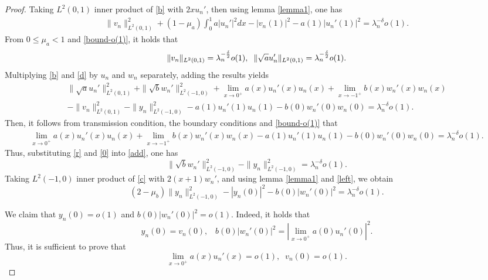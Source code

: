 \documentclass[twoside]{article}
\theoremstyle{noparens}
\theoremstyle{definition}
\numberwithin{equation}{section}
\numberwithin{figure}{section}
\begin{document}
\begin{proof}
Taking $L^2(0,1)$ inner product of \eqref{b} with $2xu_n'$, then using lemma \ref{lemma1}, one has
\begin{equation*}
	\begin{gathered}
		\|v_n\|_{L^2(0,1)}^2 + (1-\mu_a)\int_{0}^1 a|u_n'|^2 dx - |v_n(1)|^2
		-a(1)|u_n'(1)|^2
		=\lambda_n^{-\delta}o(1).
	\end{gathered}
\end{equation*}
From $0\leq \mu_a<1$ and \eqref{bound-o(1)}, it holds that
\begin{equation}\label{r}
	\|v_n\|_{L^2(0,1)} = \lambda_n^{-{\delta\over 2}}o(1),\;\;
	\|\sqrt{a}u_n'\|_{L^2(0,1)} = \lambda_n^{-{\delta\over2}}o(1).
\end{equation}
Multiplying \eqref{b} and \eqref{d} by $u_n$ and $w_n$ separately, adding the results yields
\begin{equation}\label{add}
	\begin{gathered}
		\|\sqrt{a}u_n'\|_{L^2(0,1)}^2+\|\sqrt{b}w_n'\|_{L^2(-1,0)}^2
		+ \lim_{x\to0^+} a(x)u_n'(x)u_n(x)+ \lim_{x\to-1^+}b(x)w_n'(x)w_n(x)\\
		- \|v_n\|_{L^2(0,1)}^2-\|y_n\|_{L^2(-1,0)}^2
		- a(1)u_n'(1)u_n(1)- b(0)w_n'(0)w_n(0)= \lambda_n^{-\delta} o(1).
	\end{gathered}
\end{equation}
Then, it follows from transmission condition, the boundary conditions and \eqref{bound-o(1)} that
\begin{equation}\label{0}
	\begin{gathered}
		\lim_{x\to0^+} a(x)u_n'(x)u_n(x)+\lim_{x\to-1^+}b(x)w_n'(x)w_n(x)
		- a(1)u_n'(1)u_n(1)- b(0)w_n'(0)w_n(0)
		=\lambda_n^{-\delta}o(1).
	\end{gathered}
\end{equation}
Thus, substituting \eqref{r} and \eqref{0} into \eqref{add}, one has
\begin{equation}\label{left}
	\|\sqrt{b}w_n'\|_{L^2(-1,0)}^2
	-\|y_n\|_{L^2(-1,0)}^2
	=\lambda_n^{-\delta}o(1).
\end{equation}
Taking $L^2(-1,0)$ inner product of \eqref{c} with $2(x+1)w_n'$, and using lemma \ref{lemma1} and \eqref{left}, we obtain
\begin{equation}\label{right}
	(2-\mu_b)\|y_n\|^2_{L^2(-1,0)}
	-|y_n(0)|^2 - b(0)|w_n'(0)|^2 = \lambda_n^{-\delta}o(1).
\end{equation}

We claim that $y_n(0) = o(1)$ and $b(0)|w_n'(0)|^2= o(1)$. Indeed, it holds that
\begin{equation}\label{trans0}
	y_n(0) = v_n(0),\;\;\;b(0) |w_n'(0)|^2  = \left|\lim_{x\to 0^+}a(0)u_n'(0)\right|^2.
\end{equation}
Thus, it is sufficient to prove that
\begin{equation*}
	\lim_{x\to 0^+}a(x)u_n'(x) = o(1),\;\; v_n(0) = o(1).
\end{equation*}


\end{proof}
\end{document}
